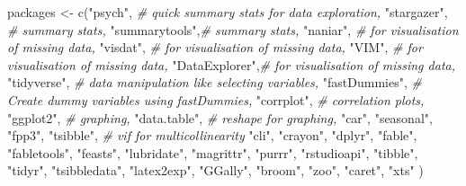 \documentclass[
]{article}
\newenvironment{Shaded}{\begin{snugshade}}{\end{snugshade}}
\newcommand{\CommentTok}[1]{\textcolor[rgb]{0.56,0.35,0.01}{\textit{#1}}}
\newcommand{\FunctionTok}[1]{\textcolor[rgb]{0.00,0.00,0.00}{#1}}
\newcommand{\NormalTok}[1]{#1}
\newcommand{\OtherTok}[1]{\textcolor[rgb]{0.56,0.35,0.01}{#1}}
\newcommand{\StringTok}[1]{\textcolor[rgb]{0.31,0.60,0.02}{#1}}
\begin{document}
\begin{Shaded}
\begin{Highlighting}[]
\NormalTok{packages }\OtherTok{\textless{}{-}} \FunctionTok{c}\NormalTok{(}\StringTok{"psych"}\NormalTok{,       }\CommentTok{\# quick summary stats for data exploration,}
              \StringTok{"stargazer"}\NormalTok{,   }\CommentTok{\# summary stats,}
              \StringTok{"summarytools"}\NormalTok{,}\CommentTok{\# summary stats,}
              \StringTok{"naniar"}\NormalTok{,      }\CommentTok{\# for visualisation of missing data,}
              \StringTok{"visdat"}\NormalTok{,      }\CommentTok{\# for visualisation of missing data,}
              \StringTok{"VIM"}\NormalTok{,         }\CommentTok{\# for visualisation of missing data,}
              \StringTok{"DataExplorer"}\NormalTok{,}\CommentTok{\# for visualisation of missing data,}
              \StringTok{"tidyverse"}\NormalTok{,   }\CommentTok{\# data manipulation like selecting variables,}
              \StringTok{"fastDummies"}\NormalTok{, }\CommentTok{\# Create dummy variables using fastDummies,}
              \StringTok{"corrplot"}\NormalTok{,    }\CommentTok{\# correlation plots,}
              \StringTok{"ggplot2"}\NormalTok{,     }\CommentTok{\# graphing,}
              \StringTok{"data.table"}\NormalTok{,  }\CommentTok{\# reshape for graphing, }
              \StringTok{"car"}\NormalTok{,}
              \StringTok{"seasonal"}\NormalTok{,}
              \StringTok{"fpp3"}\NormalTok{,}
              \StringTok{"tsibble"}\NormalTok{,    }\CommentTok{\# vif for multicollinearity}
              \StringTok{"cli"}\NormalTok{,}
              \StringTok{"crayon"}\NormalTok{,}
              \StringTok{"dplyr"}\NormalTok{,}
              \StringTok{"fable"}\NormalTok{,}
              \StringTok{"fabletools"}\NormalTok{,}
              \StringTok{"feasts"}\NormalTok{,}
              \StringTok{"lubridate"}\NormalTok{,}
              \StringTok{"magrittr"}\NormalTok{,}
              \StringTok{"purrr"}\NormalTok{,}
              \StringTok{"rstudioapi"}\NormalTok{,}
              \StringTok{"tibble"}\NormalTok{,}
              \StringTok{"tidyr"}\NormalTok{,}
              \StringTok{"tsibbledata"}\NormalTok{,}
              \StringTok{"latex2exp"}\NormalTok{,}
              \StringTok{"GGally"}\NormalTok{,}
              \StringTok{"broom"}\NormalTok{,}
              \StringTok{"zoo"}\NormalTok{,}
              \StringTok{"caret"}\NormalTok{,}
              \StringTok{"xts"}
\NormalTok{              )}



\end{Highlighting}
\end{Shaded}
\end{document}
